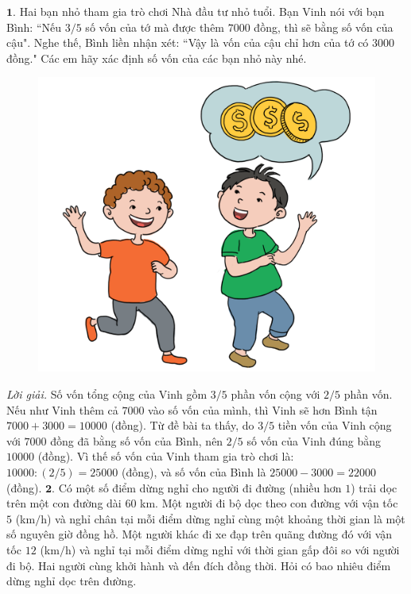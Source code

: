 \begin{multicols}{2}
	$\pmb{1.}$ Hai bạn nhỏ tham gia trò chơi Nhà đầu tư nhỏ tuổi. Bạn Vinh nói với bạn Bình: ``Nếu $3/5$ số vốn của tớ mà được thêm $7000$ đồng, thì sẽ bằng số vốn của cậu". Nghe thế, Bình liền  nhận xét: ``Vậy là vốn của cậu chỉ hơn của tớ có $3000$ đồng." Các em hãy xác định số vốn của các bạn nhỏ này nhé.
	\begin{figure}[H]
		\vspace*{-10pt}
		\centering
		\captionsetup{labelformat= empty, justification=centering}
		\includegraphics[width= 1\linewidth]{bai1}
	\end{figure}
	\textit{Lời giải.} Số vốn tổng cộng của Vinh gồm $3/5$ phần vốn cộng với $2/5$ phần vốn. Nếu như Vinh thêm cả $7000$ vào số vốn của mình, thì Vinh  sẽ hơn Bình tận  $7000+3000= 10000$ (đồng). Từ đề bài ta thấy, do $3/5$ tiền vốn của Vinh cộng với $7000$ đồng đã bằng số vốn của Bình, nên $2/5$ số vốn của Vinh đúng bằng $10000$ (đồng). Vì thế số vốn của Vinh tham gia trò chơi là: $10000: (2/5)= 25000$ (đồng), và số vốn của Bình là $25000-3000=22000$ (đồng).
	\vskip 0.1cm
	$\pmb{2.}$ Có một số điểm dừng nghỉ cho người đi đường (nhiều hơn $1$) trải dọc trên một con đường dài $60$ km. Một người đi bộ dọc theo con đường với vận tốc $5$ (km$/$h) và nghỉ chân tại mỗi điểm dừng nghỉ cùng một khoảng thời gian là một số nguyên giờ đồng hồ. Một người khác đi xe đạp trên quãng đường đó với vận tốc $12$ (km$/$h) và nghỉ tại mỗi điểm dừng nghỉ với thời gian gấp đôi so với người đi bộ. Hai người cùng khởi hành và đến đích đồng thời. Hỏi có bao nhiêu điểm dừng nghỉ dọc trên đường.

\end{multicols}

